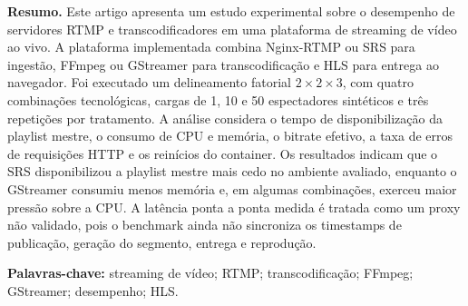 \documentclass[10pt,a4paper]{article}
\begin{document}
\noindent\textbf{Resumo.} Este artigo apresenta um estudo experimental sobre o desempenho de servidores RTMP e transcodificadores em uma plataforma de streaming de vídeo ao vivo. A plataforma implementada combina Nginx-RTMP ou SRS para ingestão, FFmpeg ou GStreamer para transcodificação e HLS para entrega ao navegador. Foi executado um delineamento fatorial $2\times2\times3$, com quatro combinações tecnológicas, cargas de 1, 10 e 50 espectadores sintéticos e três repetições por tratamento. A análise considera o tempo de disponibilização da playlist mestre, o consumo de CPU e memória, o bitrate efetivo, a taxa de erros de requisições HTTP e os reinícios do container. Os resultados indicam que o SRS disponibilizou a playlist mestre mais cedo no ambiente avaliado, enquanto o GStreamer consumiu menos memória e, em algumas combinações, exerceu maior pressão sobre a CPU. A latência ponta a ponta medida é tratada como um proxy não validado, pois o benchmark ainda não sincroniza os timestamps de publicação, geração do segmento, entrega e reprodução.

\noindent\textbf{Palavras-chave:} streaming de vídeo; RTMP; transcodificação; FFmpeg; GStreamer; desempenho; HLS.







\end{document}
